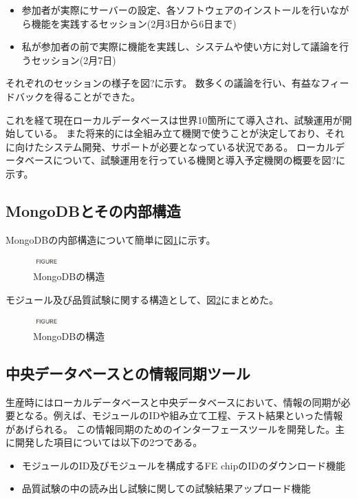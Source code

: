 \begin{itemize}
  \item 参加者が実際にサーバーの設定、各ソフトウェアのインストールを行いながら機能を実践するセッション(2月3日から6日まで)
  \item 私が参加者の前で実際に機能を実践し、システムや使い方に対して議論を行うセッション(2月7日)
\end{itemize}

それぞれのセッションの様子を図?に示す。
数多くの議論を行い、有益なフィードバックを得ることができた。

これを経て現在ローカルデータベースは世界10箇所にて導入され、試験運用が開始している。
また将来的には全組み立て機関で使うことが決定しており、それに向けたシステム開発、サポートが必要となっている状況である。
ローカルデータベースについて、試験運用を行っている機関と導入予定機関の概要を図?に示す。

\subsection{MongoDBとその内部構造}
MongoDBの内部構造について簡単に図\ref{mongodb_schema}に示す。

\begin{figure}[bpt]\centering
\includegraphics[width=1cm]{figure}
\caption[MongoDBの構造]{MongoDBの構造}
\label{mongodb_schema}
\end{figure}

モジュール及び品質試験に関する構造として、図\ref{localdb_mongodb_structure}にまとめた。

\begin{figure}[bpt]\centering
\includegraphics[width=1cm]{figure}
\caption[MongoDBの構造]{MongoDBの構造}
\label{localdb_mongodb_structure}
\end{figure}

\subsection{中央データベースとの情報同期ツール}
生産時にはローカルデータベースと中央データベースにおいて、情報の同期が必要となる。例えば、モジュールのIDや組み立て工程、テスト結果といった情報があげられる。
この情報同期のためのインターフェースツールを開発した。主に開発した項目については以下の2つである。
\begin{itemize}
  \item モジュールのID及びモジュールを構成するFE chipのIDのダウンロード機能
  \item 品質試験の中の読み出し試験に関しての試験結果アップロード機能
\end{itemize}

